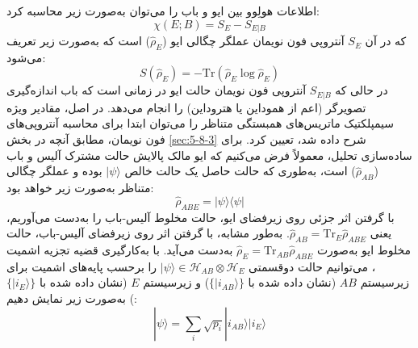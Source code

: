 اطلاعات هولِوو بین ایو و باب را می‌توان به‌صورت زیر محاسبه کرد:
\begin{equation}
	\chi(E; B) = S_E - S_{E|B}
	\label{eq:6-107}
\end{equation}
که در آن $S_E$ آنتروپی فون نویمان عملگر چگالی ایو ($\hat{\rho}_E$) است که به‌صورت زیر تعریف می‌شود:
\begin{equation}
	S(\hat{\rho}_E) = -\text{Tr}(\hat{\rho}_E \log \hat{\rho}_E)
	\label{eq:6-108}
\end{equation}
در حالی که $S_{E|B}$ آنتروپی فون نویمان حالت ایو در زمانی است که باب اندازه‌گیری تصویرگر (اعم از هموداین یا هتروداین) را انجام می‌دهد. در اصل، مقادیر ویژه سیمپلکتیک ماتریس‌های همبستگی متناظر را می‌توان ابتدا برای محاسبه آنتروپی‌های فون نویمان، مطابق آنچه در بخش \ref{sec:5-8-3} شرح داده شد، تعیین کرد. برای ساده‌سازی تحلیل، معمولاً فرض می‌کنیم که ایو مالک پالایش حالت مشترک آلیس و باب ($\hat{\rho}_{AB}$) است، به‌طوری که حالت حاصل یک حالت خالص $|\psi\rangle$ بوده و عملگر چگالی متناظر به‌صورت زیر خواهد بود:
\begin{equation}
	\hat{\rho}_{ABE} = |\psi\rangle \langle \psi|
	\label{eq:6-109}
\end{equation}
با گرفتن اثر جزئی روی زیرفضای ایو، حالت مخلوط آلیس-باب را به‌دست می‌آوریم، یعنی $\hat{\rho}_{AB} = \text{Tr}_E \hat{\rho}_{ABE}$. به‌طور مشابه، با گرفتن اثر روی زیرفضای آلیس-باب، حالت مخلوط ایو به‌صورت $\hat{\rho}_E = \text{Tr}_{AB} \hat{\rho}_{ABE}$ به‌دست می‌آید. با به‌کارگیری قضیه تجزیه اشمیت \cite{2,7,9}، می‌توانیم حالت دوقسمتی $|\psi\rangle \in \mathcal{H}_{AB} \otimes \mathcal{H}_E$ را برحسب پایه‌های اشمیت برای زیرسیستم $AB$ (نشان داده شده با $\{|i_{AB}\rangle\}$) و زیرسیستم $E$ (نشان داده شده با $\{|i_E\rangle\}$) به‌صورت زیر نمایش دهیم:
\begin{equation}
	|\psi\rangle = \sum_i \sqrt{p_i} |i_{AB}\rangle |i_E\rangle
	\label{eq:6-110}
\end{equation}

